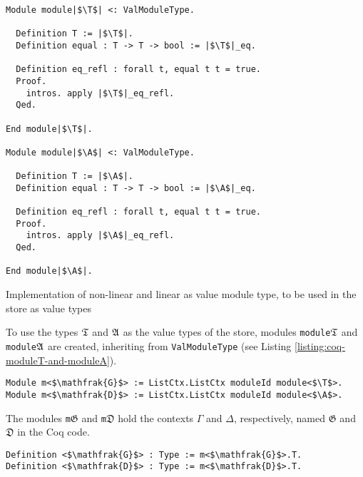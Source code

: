 \begin{listing}[t]
\begin{verbatim}
Module module|$\T$| <: ValModuleType.

  Definition T := |$\T$|.
  Definition equal : T -> T -> bool := |$\T$|_eq.

  Definition eq_refl : forall t, equal t t = true.
  Proof.
    intros. apply |$\T$|_eq_refl.
  Qed.

End module|$\T$|.

Module module|$\A$| <: ValModuleType.

  Definition T := |$\A$|.
  Definition equal : T -> T -> bool := |$\A$|_eq.

  Definition eq_refl : forall t, equal t t = true.
  Proof.
    intros. apply |$\A$|_eq_refl.
  Qed.

End module|$\A$|.
\end{verbatim}
\caption{Implementation of non-linear and linear as value module type, to be used in the store as value types}
\label{listing:coq-moduleT-and-moduleA}
\end{listing}

To use the types $\mathfrak{T}$ and $\mathfrak{A}$ as the value types of the store, modules \texttt{module}$\mathfrak{T}$ and \texttt{module}$\mathfrak{A}$ are created, inheriting from \texttt{ValModuleType} (see Listing \ref{listing:coq-moduleT-and-moduleA}).

\begin{verbatim}
Module m<$\mathfrak{G}$> := ListCtx.ListCtx moduleId module<$\T$>.
Module m<$\mathfrak{D}$> := ListCtx.ListCtx moduleId module<$\A$>.
\end{verbatim}

The modules \texttt{m}$\mathfrak{G}$ and \texttt{m}$\mathfrak{D}$ hold the contexts $\Gamma$ and $\Delta$, respectively, named $\mathfrak{G}$ and $\mathfrak{D}$ in the Coq code.

\begin{verbatim}
Definition <$\mathfrak{G}$> : Type := m<$\mathfrak{G}$>.T.
Definition <$\mathfrak{D}$> : Type := m<$\mathfrak{D}$>.T.
\end{verbatim}